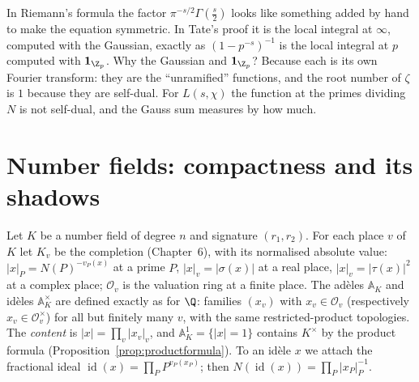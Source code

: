 \begin{think}
In Riemann's formula the factor $\pi^{-s/2}\Gamma(\frac s2)$ looks like something added by hand to make the equation symmetric. In Tate's proof
it is the local integral at $\infty$, computed with the Gaussian, exactly as $(1-p^{-s})^{-1}$ is the local integral at $p$ computed with
$\mathbf 1_{\Z_p}$. Why the Gaussian and $\mathbf 1_{\Z_p}$? Because each is its own Fourier transform: they are the ``unramified'' functions, and
the root number of $\zeta$ is $1$ because they are self-dual. For $L(s,\chi)$ the function at the primes dividing $N$ is not self-dual, and the
Gauss sum measures by how much.
\end{think}

\section{Number fields: compactness and its shadows}

Let $K$ be a number field of degree $n$ and signature $(r_1,r_2)$. For each place $v$ of $K$ let $K_v$ be the completion (Chapter~6), with its
normalised absolute value: $|x|_P=N(P)^{-v_P(x)}$ at a prime $P$, $|x|_v=|\sigma(x)|$ at a real place, $|x|_v=|\tau(x)|^2$ at a complex place;
$\mathcal O_v$ is the valuation ring at a finite place. The ad\`eles $\mathbb{A}_K$ and id\`eles $\mathbb{A}_K^\times$ are defined exactly as for $\Q$: families
$(x_v)$ with $x_v\in\mathcal O_v$ (respectively $x_v\in\mathcal O_v^\times$) for all but finitely many $v$, with the same restricted-product topologies.
The \emph{content} is $|x|=\prod_v|x_v|_v$, and $\mathbb{A}_K^1=\{|x|=1\}$ contains $K^\times$ by the product formula
(Proposition~\ref{prop:productformula}). To an id\`ele $x$ we attach the fractional ideal $\operatorname{id}(x)=\prod_PP^{v_P(x_P)}$; then
$N(\operatorname{id}(x))=\prod_P|x_P|_P^{-1}$.

